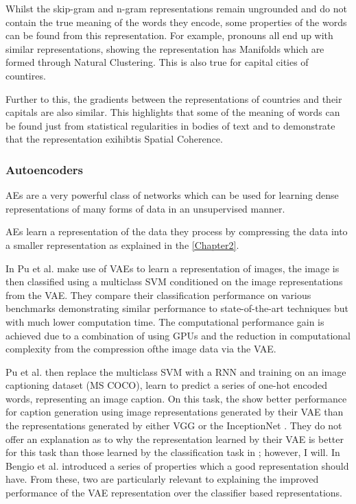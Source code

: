 Whilst the skip-gram and n-gram representations remain ungrounded and do not contain the true meaning of the words they encode, some properties of the words can be found from this representation. For example, pronouns all end up with similar representations, showing the representation has Manifolds which are formed through Natural Clustering. This is also true for capital cities of countires. 

Further to this, the gradients between the representations of countries and their capitals are also similar. This highlights that some of the meaning of words can be found just from statistical regularities in bodies of text and to demonstrate that the representation exihibtis Spatial Coherence.


\subsubsection{Autoencoders}
\ac{AE}s are a very powerful class of networks which can be used for learning dense representations of many forms of data in an unsupervised manner.

\ac{AE}s learn a representation of the data they process by compressing the data into a smaller representation as explained in the \ref{Chapter2}.

In \cite{pu2016variational} Pu et al. make use of \ac{VAE}s to learn a representation of images, the image is then classified using a multiclass \ac{SVM} conditioned on the image representations from the \ac{VAE}. They compare their classification performance on various benchmarks demonstrating similar performance to state-of-the-art techniques but with much lower computation time. The computational performance gain is achieved due to a combination of using \ac{GPU}s and the reduction in computational complexity from the compression ofthe image data via the \ac{VAE}.

Pu et al. then replace the multiclass \ac{SVM} with a \ac{RNN} and training on an image captioning dataset (MS COCO\cite{lin2014microsoft}), learn to predict a series of one-hot encoded words, representing an image caption. On this task, the show better performance for caption generation using image representations generated by their \ac{VAE} than the representations generated by either VGG \cite{simonyan2014very} or the InceptionNet \cite{szegedy2015going}. They do not offer an explanation as to why the representation learned by their \ac{VAE} is better for this task than those learned by the classification task in \cite{simonyan2014very, szegedy2015going}; however, I will.
In \cite{repRev} Bengio et al. introduced a series of properties which a good representation should have. From these, two are particularly relevant to explaining the improved performance of the \ac{VAE} representation over the classifier based representations.

